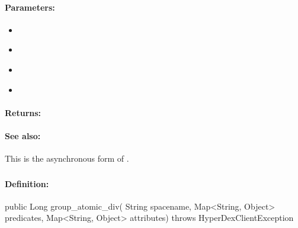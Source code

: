 \paragraph{Parameters:}
\begin{itemize}[noitemsep]
\item {}\\

\item {}\\

\item {}\\

\item {}\\

\end{itemize}

\paragraph{Returns:}


\paragraph{See also:}  This is the asynchronous form of .

\pagebreak
\subsubsection{}
\label{api:java:group_atomic_div}


\paragraph{Definition:}
\begin{javacode}
public Long group_atomic_div(
        String spacename,
        Map<String, Object> predicates,
        Map<String, Object> attributes) throws HyperDexClientException
\end{javacode}

